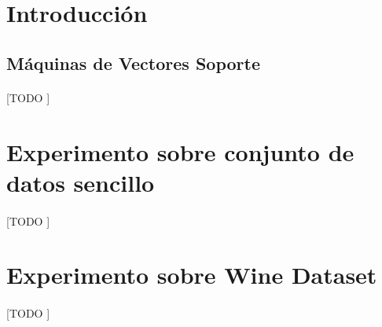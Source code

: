 \documentclass{article}
\begin{document}
	\maketitle %

	\thispagestyle{fancy} %



	\begin{abstract}
		\noindent [TODO ]
	\end{abstract}



	\section{Introducción}
	\label{sec:introducción}

		\subsection{Máquinas de Vectores Soporte}
		\label{sec:support-vector-machine}

			\paragraph{}
			[TODO ]

	\section{Experimento sobre conjunto de datos sencillo}
	\label{sec:e1}

		\paragraph{}
		[TODO ]
		
	\section{Experimento sobre Wine Dataset}
	\label{sec:e2}

		\paragraph{}
		[TODO ]

	\nocite{subject:taa}
	\nocite{garciparedes:machine-learning-support-vector-machine}
	\nocite{dataset:wine}
  
  
\end{document}
